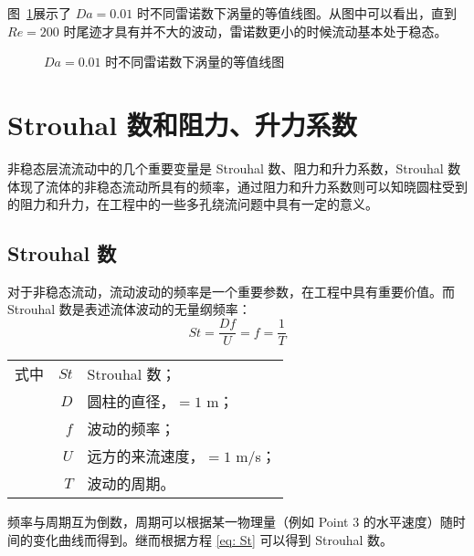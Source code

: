 图~\ref{fig: vorticity-contour-1e-2}展示了 $Da=0.01$ 时不同雷诺数下涡量的等值线图。从图中可以看出，直到 $Re=200$ 时尾迹才具有并不大的波动，雷诺数更小的时候流动基本处于稳态。

\begin{figure}
	\centering
	\begin{minipage}{\textwidth}
		\centering
	\end{minipage}
	\centering
	\begin{minipage}{\textwidth}
		\centering
	\end{minipage}
	\caption{$Da=0.01$ 时不同雷诺数下涡量的等值线图}
	\label{fig: vorticity-contour-1e-2}
\end{figure}

\section{Strouhal 数和阻力、升力系数}

非稳态层流流动中的几个重要变量是 Strouhal 数、阻力和升力系数，Strouhal 数体现了流体的非稳态流动所具有的频率，通过阻力和升力系数则可以知晓圆柱受到的阻力和升力，在工程中的一些多孔绕流问题中具有一定的意义。

\subsection{Strouhal 数}

对于非稳态流动，流动波动的频率是一个重要参数，在工程中具有重要价值。而 Strouhal 数是表述流体波动的无量纲频率：
\begin{equation}\label{eq: St}
	St = \frac{Df}{U} = f = \frac{1}{T}
\end{equation}
\begin{tabularx}{\textwidth}{@{}l@{\quad}r@{——}X@{}}
	式中 & $St$ & Strouhal 数；\\
		& $D$ & 圆柱的直径，$=1$ m；\\
		& $f$ & 波动的频率；\\
		& $U$ & 远方的来流速度，$=1$ m/s；\\
		& $T$ & 波动的周期。 
\end{tabularx}\vspace{3.15bp}
频率与周期互为倒数，周期可以根据某一物理量（例如 Point 3 的水平速度）随时间的变化曲线而得到。继而根据方程 \eqref{eq: St} 可以得到 Strouhal 数。%

